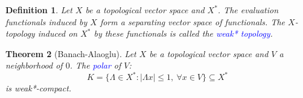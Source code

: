 \documentclass[11pt]{article}
\theoremstyle{thmstyle}
\newtheorem{theorem}{Theorem}[section]
\theoremstyle{defstyle}
\newtheorem{definition}[theorem]{Definition}
\newcommand{\define}[1]{\textcolor{blue}{\textit{#1}}}
\renewcommand{\le}{\leqslant}
\begin{document}
\begin{definition}
    Let $X$ be a topological vector space and $X^\ast$. The evaluation functionals induced by $X$ form a separating vector space of functionals. The $X$-topology induced on $X^\ast$ by these functionals is called the \define{weak* topology}.
\end{definition}

\begin{theorem}[Banach-Alaoglu]
    Let $X$ be a topological vector space and $V$ a neighborhood of $0$. The \define{polar} of $V$: 
    \begin{equation*}
        K = \{\Lambda\in X^\ast\colon |\Lambda x|\le 1,~\forall x\in V\}\subseteq X^\ast
    \end{equation*}
    is weak*-compact.
\end{theorem}
\end{document}
